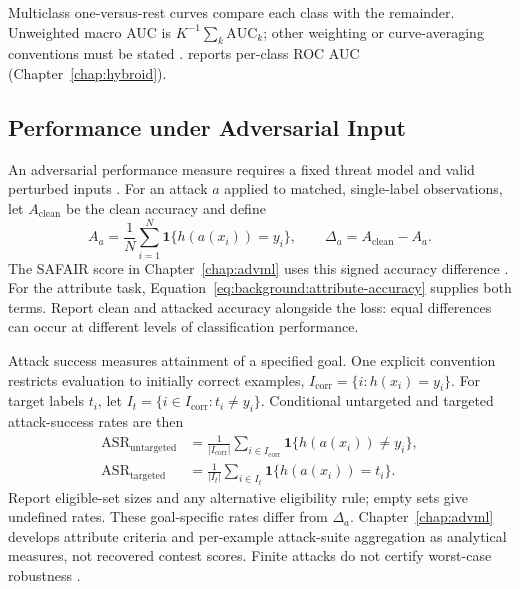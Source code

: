 Multiclass one-versus-rest curves compare each class with the remainder. Unweighted macro AUC
is $K^{-1}\sum_k\mathrm{AUC}_k$; other weighting or curve-averaging conventions must be stated
\cite{fawcett2006roc}. \hybroid{} reports per-class ROC AUC (Chapter~\ref{chap:hybroid}).

\subsection{Performance under Adversarial Input}
\label{sec:background:metrics:adversarial}

An adversarial performance measure requires a fixed threat model and valid perturbed inputs
\cite{carlini2019evaluating}. For an attack $a$ applied to matched, single-label observations,
let $A_{\mathrm{clean}}$ be the clean accuracy and define
\begin{equation}
  A_a=\frac1N\sum_{i=1}^{N}\mathbf1\{h(a(x_i))=y_i\},
  \qquad \Delta_a=A_{\mathrm{clean}}-A_a.
  \label{eq:background:accuracy-loss}
\end{equation}
The SAFAIR score in Chapter~\ref{chap:advml} uses this signed accuracy difference
\cite{sparta2022d76}. For the attribute task, Equation~\ref{eq:background:attribute-accuracy}
supplies both terms. Report clean and attacked accuracy alongside the loss: equal differences
can occur at different levels of classification performance.

Attack success measures attainment of a specified goal. One explicit convention restricts
evaluation to initially correct examples, $I_{\mathrm{corr}}=\{i:h(x_i)=y_i\}$. For target
labels $t_i$, let $I_t=\{i\in I_{\mathrm{corr}}:t_i\neq y_i\}$. Conditional untargeted and
targeted attack-success rates are then
\begin{equation}
  \begin{aligned}
    \mathrm{ASR}_{\mathrm{untargeted}}
      &=\frac1{|I_{\mathrm{corr}}|}\sum_{i\in I_{\mathrm{corr}}}
        \mathbf1\{h(a(x_i))\neq y_i\},\\
    \mathrm{ASR}_{\mathrm{targeted}}
      &=\frac1{|I_t|}\sum_{i\in I_t}\mathbf1\{h(a(x_i))=t_i\}.
  \end{aligned}
  \label{eq:background:attack-success}
\end{equation}
Report eligible-set sizes and any alternative eligibility rule; empty sets give undefined rates.
These goal-specific rates differ from $\Delta_a$. Chapter~\ref{chap:advml} develops attribute
criteria and per-example attack-suite aggregation as analytical measures, not recovered contest
scores. Finite attacks do not certify worst-case robustness
\cite{carlini2019evaluating}.

